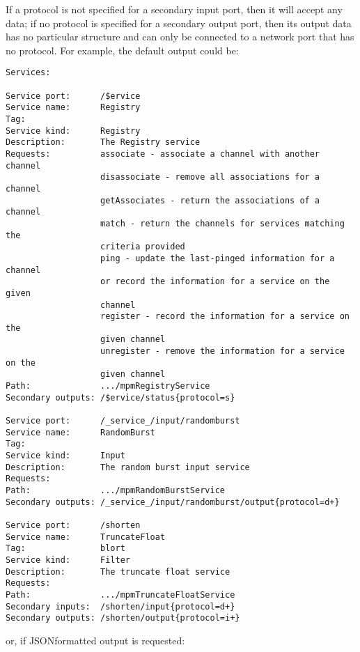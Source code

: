 If a protocol is not specified for a secondary input port, then it will accept any data;
if no protocol is specified for a secondary output port, then its output data has no
particular structure and can only be connected to a \yarp{} network port that has no
protocol.
\condPage{}
For example, the default output could be:
\outputBegin{}
\begin{verbatim}
Services:

Service port:      /$ervice
Service name:      Registry
Tag:
Service kind:      Registry
Description:       The Registry service
Requests:          associate - associate a channel with another channel
                   disassociate - remove all associations for a channel
                   getAssociates - return the associations of a channel
                   match - return the channels for services matching the
                   criteria provided
                   ping - update the last-pinged information for a channel
                   or record the information for a service on the given
                   channel
                   register - record the information for a service on the
                   given channel
                   unregister - remove the information for a service on the
                   given channel
Path:              .../mpmRegistryService
Secondary outputs: /$ervice/status{protocol=s}

Service port:      /_service_/input/randomburst
Service name:      RandomBurst
Tag:
Service kind:      Input
Description:       The random burst input service
Requests:
Path:              .../mpmRandomBurstService
Secondary outputs: /_service_/input/randomburst/output{protocol=d+}

Service port:      /shorten
Service name:      TruncateFloat
Tag:               blort
Service kind:      Filter
Description:       The truncate float service
Requests:
Path:              .../mpmTruncateFloatService
Secondary inputs:  /shorten/input{protocol=d+}
Secondary outputs: /shorten/output{protocol=i+}
\end{verbatim}
\outputEnd{}
\condPage{}
or, if JSON\longDash{}formatted output is requested:
\outputBegin{}
